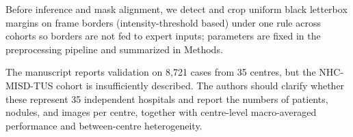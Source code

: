 \begin{authorresponse}
Before inference and mask alignment, we detect and crop uniform black letterbox margins on frame borders (intensity-threshold based) under one rule across cohorts so borders are not fed to expert inputs; parameters are fixed in the preprocessing pipeline and summarized in Methods.\par
\par
\end{authorresponse}

\begin{reviewercomment}
The manuscript reports validation on 8,721 cases from 35 centres, but the NHC-MISD-TUS cohort is insufficiently described. The authors should clarify whether these represent 35 independent hospitals and report the numbers of patients, nodules, and images per centre, together with centre-level macro-averaged performance and between-centre heterogeneity.
\end{reviewercomment}
